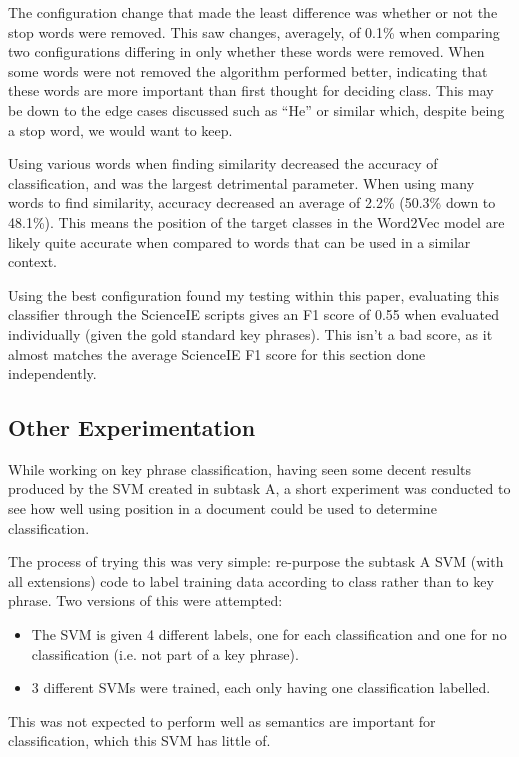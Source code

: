 The configuration change that made the least difference was whether or not the stop words were removed. This saw changes, averagely, of 0.1\% when comparing two configurations differing in only whether these words were removed. When some words were not removed the algorithm performed better, indicating that these words are more important than first thought for deciding class. This may be down to the edge cases discussed such as ``He'' or similar which, despite being a stop word, we would want to keep.

Using various words when finding similarity decreased the accuracy of classification, and was the largest detrimental parameter. When using many words to find similarity, accuracy decreased an average of 2.2\% (50.3\% down to 48.1\%). This means the position of the target classes in the Word2Vec model are likely quite accurate when compared to words that can be used in a similar context.

Using the best configuration found my testing within this paper, evaluating this classifier through the ScienceIE scripts gives an F1 score of 0.55 when evaluated individually (given the gold standard key phrases). This isn't a bad score, as it almost matches the average ScienceIE F1 score for this section done independently.

\subsection*{Other Experimentation}
While working on key phrase classification, having seen some decent results produced by the SVM created in subtask A, a short experiment was conducted to see how well using position in a document could be used to determine classification.

The process of trying this was very simple: re-purpose the subtask A SVM (with all extensions) code to label training data according to class rather than to key phrase. Two versions of this were attempted:

\begin{itemize}
	\item The SVM is given 4 different labels, one for each classification and one for no classification (i.e. not part of a key phrase).
	\item 3 different SVMs were trained, each only having one classification labelled.
\end{itemize}

This was not expected to perform well as semantics are important for classification, which this SVM has little of.

